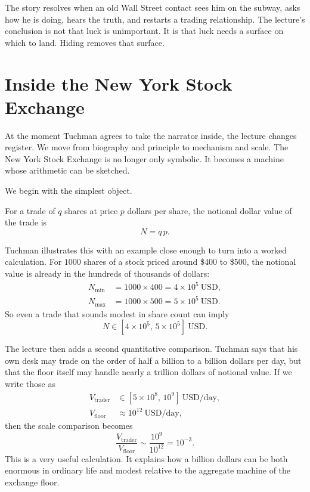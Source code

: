 The story resolves when an old Wall Street contact sees him on the subway, asks how he is doing, hears the truth, and restarts a trading relationship. The lecture's conclusion is not that luck is unimportant. It is that luck needs a surface on which to land. Hiding removes that surface.

\section{Inside the New York Stock Exchange}

At the moment Tuchman agrees to take the narrator inside, the lecture changes register. We move from biography and principle to mechanism and scale. The New York Stock Exchange is no longer only symbolic. It becomes a machine whose arithmetic can be sketched.

We begin with the simplest object.

\begin{definition}
For a trade of $q$ shares at price $p$ dollars per share, the notional dollar value of the trade is
\begin{equation}
N = q\,p.
\end{equation}
\end{definition}

Tuchman illustrates this with an example close enough to turn into a worked calculation. For $1000$ shares of a stock priced around \$400 to \$500, the notional value is already in the hundreds of thousands of dollars:
\begin{align}
N_{\min} &= 1000 \times 400 = 4\times 10^5\ \mathrm{USD},\\
N_{\max} &= 1000 \times 500 = 5\times 10^5\ \mathrm{USD}.
\end{align}
So even a trade that sounds modest in share count can imply
\begin{equation}
N \in [4\times 10^5,\,5\times 10^5]\ \mathrm{USD}.
\end{equation}

The lecture then adds a second quantitative comparison. Tuchman says that his own desk may trade on the order of half a billion to a billion dollars per day, but that the floor itself may handle nearly a trillion dollars of notional value. If we write those as
\begin{align}
V_{\mathrm{trader}} &\in [5\times 10^8,\,10^9]\ \mathrm{USD/day},\\
V_{\mathrm{floor}} &\approx 10^{12}\ \mathrm{USD/day},
\end{align}
then the scale comparison becomes
\begin{equation}
\frac{V_{\mathrm{trader}}}{V_{\mathrm{floor}}}\sim \frac{10^9}{10^{12}} = 10^{-3}.
\end{equation}
This is a very useful calculation. It explains how a billion dollars can be both enormous in ordinary life and modest relative to the aggregate machine of the exchange floor.

